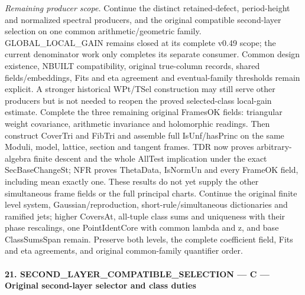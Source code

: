 \documentclass[11pt,a4paper]{article}
\numberwithin{equation}{section}
\theoremstyle{remark}\newtheorem{remark}[theorem]{Remark}
\begin{document}
\emph{Remaining producer scope.} Continue the distinct retained-defect, period-height and normalized spectral producers, and the original compatible second-layer selection on one common arithmetic/geometric family. GLOBAL\_\allowbreak LOCAL\_\allowbreak GAIN remains closed at its complete v0.49 scope; the current denominator work only completes its separate consumer. Common design existence, NBUILT compatibility, original true-column records, shared fields/embeddings, Fits and eta agreement and eventual-family thresholds remain explicit. A stronger historical WPt/TSel construction may still serve other producers but is not needed to reopen the proved selected-class local-gain estimate. Complete the three remaining original FramesOK fields: triangular weight covariance, arithmetic invariance and holomorphic readings. Then construct CoverTri and FibTri and assemble full IsUnf/hasPrinc on the same Moduli, model, lattice, section and tangent frames. TDR now proves arbitrary-algebra finite descent and the whole AllTest implication under the exact SecBaseChangeSt; NFR proves ThetaData, IsNormUn and every FrameOK field, including mean exactly one. These results do not yet supply the other simultaneous frame fields or the full principal charts. Continue the original finite level system, Gaussian/reproduction, short-rule/simultaneous dictionaries and ramified jets; higher CoversAt, all-tuple class sums and uniqueness with their phase rescalings, one PointIdentCore with common lambda and z, and base ClassSumsSpan remain. Preserve both levels, the complete coefficient field, Fits and eta agreements, and original common-family quantifier order.



\paragraph{21. SECOND\_\allowbreak LAYER\_\allowbreak COMPATIBLE\_\allowbreak SELECTION — C — Original second-layer selector and class duties}
\end{document}
